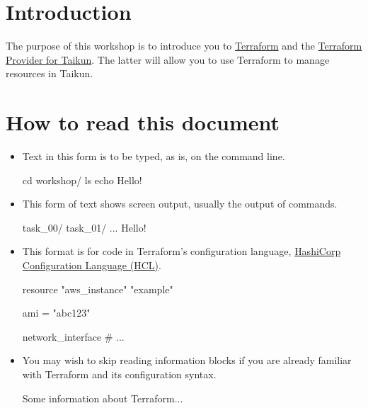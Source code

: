\section{Introduction}
The purpose of this workshop is to introduce you to
\href{https://www.terraform.io/intro/index.html}{Terraform}
and the \href{https://github.com/itera-io/terraform-provider-taikun}{Terraform Provider for Taikun}.
The latter will allow you to use Terraform to manage resources in Taikun.

\section{How to read this document}

\begin{itemize}
  \item Text in this form is to be typed, as is, on the command line.
\begin{shell}
cd workshop/
ls
echo Hello!
\end{shell}
\item This form of text shows screen output, usually the output of commands.
\begin{raw}
task_00/
task_01/
...
Hello!
\end{raw}
\item This format is for code in Terraform's configuration language,
\href{https://www.terraform.io/docs/language/syntax/configuration.html}{HashiCorp Configuration Language (HCL)}.
\begin{tf}
resource "aws_instance" "example" {
  ami = "abc123"

  network_interface {
    # ...
  }
}
\end{tf}
\item You may wish to skip reading information blocks if you are already familiar with
Terraform and its configuration syntax.
\begin{tip}
  Some information about Terraform...
\end{tip}
\end{itemize}
